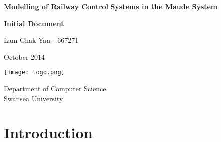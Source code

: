 \documentclass[a4paper,11pt]{report}
\begin{document}

%
%

\begin{center}
{\huge \bf Modelling of Railway Control Systems in the Maude System}
\end{center}

\begin{center}
\vspace{2cm}
{\Large \bf Initial Document}
\end{center}

\begin{center}
{\small  Lam Chak Yan - 667271}
\end{center}

\begin{center}
October 2014
\end{center}

\vspace{8cm}

\begin{center}
\texttt{[image: logo.png]}
\end{center}

\begin{center}
Department of Computer Science\\
Swansea University
\end{center}

\thispagestyle{empty}

\newpage

\thispagestyle{empty}

\newpage
{}
\tableofcontents{}
\thispagestyle{empty}
\newpage
\setcounter{page}{1}
\titlespacing*{\chapter}{0pt}{-30mm}{40pt}
\chapter{Introduction}
\label{sec:intro}
\end{document}
